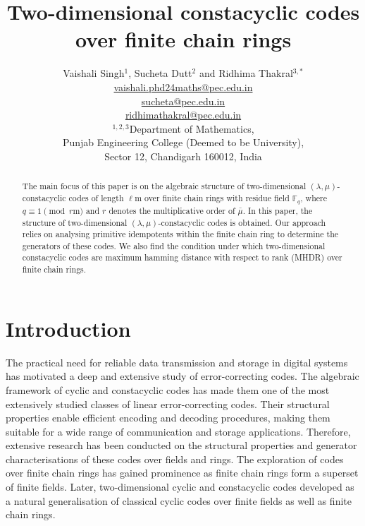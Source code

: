 \documentclass[12pt,a4paper]{article}
\begin{document}
\title{Two-dimensional constacyclic codes over finite chain rings}
\author{
Vaishali Singh$^{1}$, Sucheta Dutt$^{2}$ and Ridhima Thakral$^{3,*}$\\[6pt]
\href{mailto:vaishali.phd24maths@pec.edu.in}{vaishali.phd24maths@pec.edu.in}\\[6pt]
\href{mailto:sucheta@pec.edu.in}{sucheta@pec.edu.in}\\[6pt]
\href{mailto:ridhimathakral@pec.edu.in}{ridhimathakral@pec.edu.in}\\[6pt]
$^{1,2,3}$Department of Mathematics,\\ 
Punjab Engineering College 
(Deemed to be University),\\
Sector 12, Chandigarh 160012, India\\
}
\date{}
\maketitle

\begin{abstract}
The main focus of this paper is on the algebraic structure of two-dimensional $(\lambda,\mu)$-constacyclic codes of length $\ell\mathrm{m}$ over finite chain rings with residue field $\mathbb{F}_q$, where $q \equiv 1 \pmod{r\mathrm{m}}$ and $r$ denotes the multiplicative order of $\bar{\mu}$.  In this paper, the structure of two-dimensional $(\lambda,\mu)$-constacyclic codes is obtained. Our approach relies on analysing primitive idempotents within the finite chain ring to determine the generators of these codes. We also find the condition under which two-dimensional constacyclic codes are maximum hamming distance with respect to rank (MHDR) over finite chain rings.

\end{abstract}

\section{Introduction}
The practical need for reliable data transmission and storage in digital systems has motivated a deep and extensive study of error-correcting codes. The algebraic framework of cyclic and constacyclic codes has made them one of the most extensively studied classes of linear error-correcting codes. Their structural properties enable efficient encoding and decoding procedures, making them suitable for a wide range of communication and storage applications. Therefore, extensive research has been conducted on the structural properties and generator characterisations of these codes over fields and rings. The exploration of codes over finite chain rings has gained prominence as finite chain rings form a superset of finite fields. Later, two-dimensional cyclic and constacyclic codes developed as a natural generalisation of classical cyclic codes over finite fields as well as finite chain rings.
\end{document}
